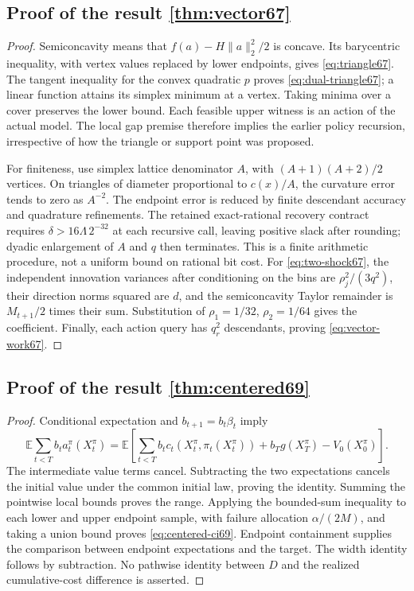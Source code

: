 \subsection{Proof of the result \ref{thm:vector67}}\label{supp:proof70-vector67-1}
\begin{proof}
Semiconcavity means that $f(a)-H\|a\|_2^2/2$ is concave. Its barycentric inequality, with vertex values replaced by lower endpoints, gives \eqref{eq:triangle67}. The tangent inequality for the convex quadratic $p$ proves \eqref{eq:dual-triangle67}; a linear function attains its simplex minimum at a vertex. Taking minima over a cover preserves the lower bound. Each feasible upper witness is an action of the actual model. The local gap premise therefore implies the earlier policy recursion, irrespective of how the triangle or support point was proposed.

For finiteness, use simplex lattice denominator $A$, with $(A+1)(A+2)/2$ vertices. On triangles of diameter proportional to $c(x)/A$, the curvature error tends to zero as $A^{-2}$. The endpoint error is reduced by finite descendant accuracy and quadrature refinements. The retained exact-rational recovery contract requires $\delta>16\Lambda\,2^{-32}$ at each recursive call, leaving positive slack after rounding; dyadic enlargement of $A$ and $q$ then terminates. This is a finite arithmetic procedure, not a uniform bound on rational bit cost. For \eqref{eq:two-shock67}, the independent innovation variances after conditioning on the bins are $\rho_j^2/(3q^2)$, their direction norms squared are $d$, and the semiconcavity Taylor remainder is $M_{t+1}/2$ times their sum. Substitution of $\rho_1=1/32$, $\rho_2=1/64$ gives the coefficient. Finally, each action query has $q_r^2$ descendants, proving \eqref{eq:vector-work67}.
\end{proof}

\subsection{Proof of the result \ref{thm:centered69}}\label{supp:proof70-centered69-1}
\begin{proof}
Conditional expectation and $b_{t+1}=b_t\beta_t$ imply
\[
 \mathbb E\sum_{t<T}b_t a_t^\pi(X_t^\pi)
 =\mathbb E\left[\sum_{t<T}b_tc_t(X_t^\pi,\pi_t(X_t^\pi))
                  +b_Tg(X_T^\pi)-V_0(X_0^\pi)\right].
\]
The intermediate value terms cancel. Subtracting the two expectations cancels the initial value under the common initial law, proving the identity. Summing the pointwise local bounds proves the range. Applying the bounded-sum inequality to each lower and upper endpoint sample, with failure allocation $\alpha/(2M)$, and taking a union bound proves \eqref{eq:centered-ci69}. Endpoint containment supplies the comparison between endpoint expectations and the target. The width identity follows by subtraction. No pathwise identity between $D$ and the realized cumulative-cost difference is asserted.
\end{proof}

